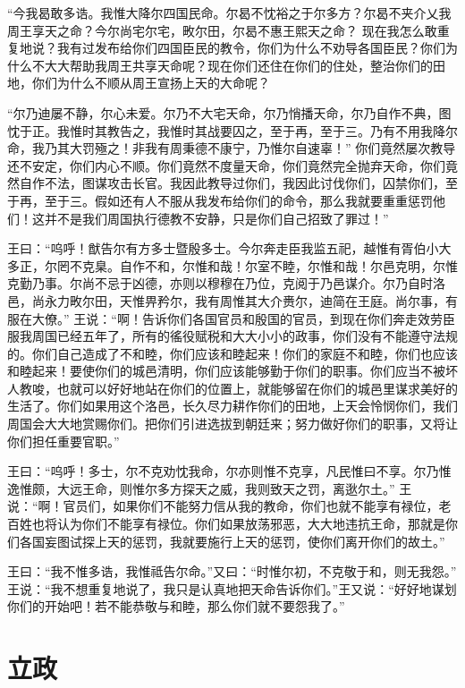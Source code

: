 \documentclass[a4paper,12pt,UTF8,twoside]{ctexbook}
\begin{document}
“今我曷敢多诰。我惟大降尔四国民命。尔曷不忱裕之于尔多方？尔曷不夹介乂我周王享天之命？今尔尚宅尔宅，畋尔田，尔曷不惠王熙天之命？
现在我怎么敢重复地说？我有过发布给你们四国臣民的教令，你们为什么不劝导各国臣民？你们为什么不大大帮助我周王共享天命呢？现在你们还住在你们的住处，整治你们的田地，你们为什么不顺从周王宣扬上天的大命呢？

“尔乃迪屡不静，尔心未爱。尔乃不大宅天命，尔乃悄播天命，尔乃自作不典，图忱于正。我惟时其教告之，我惟时其战要囚之，至于再，至于三。乃有不用我降尔命，我乃其大罚殛之！非我有周秉德不康宁，乃惟尔自速辜！”
你们竟然屡次教导还不安定，你们内心不顺。你们竟然不度量天命，你们竟然完全抛弃天命，你们竟然自作不法，图谋攻击长官。我因此教导过你们，我因此讨伐你们，囚禁你们，至于再，至于三。假如还有人不服从我发布给你们的命令，那么我就要重重惩罚他们！这并不是我们周国执行德教不安静，只是你们自己招致了罪过！”

王曰：“呜呼！猷告尔有方多士暨殷多士。今尔奔走臣我监五祀，越惟有胥伯小大多正，尔罔不克臬。自作不和，尔惟和哉！尔室不睦，尔惟和哉！尔邑克明，尔惟克勤乃事。尔尚不忌于凶德，亦则以穆穆在乃位，克阅于乃邑谋介。尔乃自时洛邑，尚永力畋尔田，天惟畀矜尔，我有周惟其大介赉尔，迪简在王庭。尚尔事，有服在大僚。”
王说：“啊！告诉你们各国官员和殷国的官员，到现在你们奔走效劳臣服我周国已经五年了，所有的徭役赋税和大大小小的政事，你们没有不能遵守法规的。你们自己造成了不和睦，你们应该和睦起来！你们的家庭不和睦，你们也应该和睦起来！要使你们的城邑清明，你们应该能够勤于你们的职事。你们应当不被坏人教唆，也就可以好好地站在你们的位置上，就能够留在你们的城邑里谋求美好的生活了。你们如果用这个洛邑，长久尽力耕作你们的田地，上天会怜悯你们，我们周国会大大地赏赐你们。把你们引进选拔到朝廷来；努力做好你们的职事，又将让你们担任重要官职。”

王曰：“呜呼！多士，尔不克劝忱我命，尔亦则惟不克享，凡民惟曰不享。尔乃惟逸惟颇，大远王命，则惟尔多方探天之威，我则致天之罚，离逖尔土。”
王说：“啊！官员们，如果你们不能努力信从我的教命，你们也就不能享有禄位，老百姓也将认为你们不能享有禄位。你们如果放荡邪恶，大大地违抗王命，那就是你们各国妄图试探上天的惩罚，我就要施行上天的惩罚，使你们离开你们的故土。”

王曰：“我不惟多诰，我惟祗告尔命。”又曰：“时惟尔初，不克敬于和，则无我怨。”
王说：“我不想重复地说了，我只是认真地把天命告诉你们。”王又说：“好好地谋划你们的开始吧！若不能恭敬与和睦，那么你们就不要怨我了。”

\chapter{立政}
\end{document}
